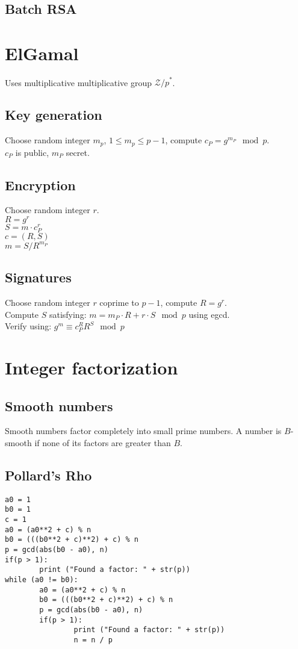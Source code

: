 \documentclass{article}
\begin{document}
\subsection{Batch RSA}

\section{ElGamal}
Uses multiplicative multiplicative group ${\mathcal{Z}/p}^{*}$.
\subsection{Key generation}
Choose random integer $m_p$, $1 \leq m_p \leq p-1$, compute $c_P=g^{m_P} \mod p$. \\
$c_P$ is public, $m_P$ secret.

\subsection{Encryption}
Choose random integer $r$. \\
$R=g^r$ \\
$S=m \cdot c_P^r$ \\
$c=(R,S)$ \\
$m=S/R^{m_P}$ \\

\subsection{Signatures}
Choose random integer $r$ coprime to $p-1$, compute $R=g^r$. \\
Compute $S$ satisfying:
$m=m_P \cdot R + r \cdot S \mod p$ 
using egcd. \\
Verify using:
$g^m \equiv c_P^R R^S \mod p$ \\

\section{Integer factorization}
\subsection{Smooth numbers}
Smooth numbers factor completely into small prime numbers. A number is $B$-smooth if none of its factors are greater than $B$.

\subsection{Pollard's Rho}
\begin{verbatim}
a0 = 1
b0 = 1
c = 1
a0 = (a0**2 + c) % n
b0 = (((b0**2 + c)**2) + c) % n
p = gcd(abs(b0 - a0), n)
if(p > 1):
        print ("Found a factor: " + str(p))
while (a0 != b0):
        a0 = (a0**2 + c) % n
        b0 = (((b0**2 + c)**2) + c) % n
        p = gcd(abs(b0 - a0), n)
        if(p > 1):
                print ("Found a factor: " + str(p))
                n = n / p
\end{verbatim}
\end{document}
